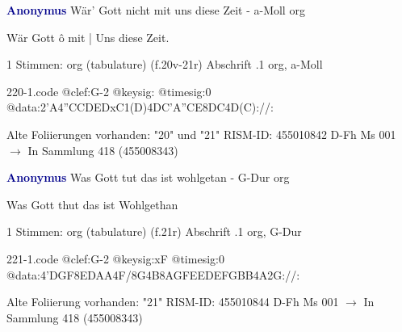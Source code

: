 \documentclass[twocolumn]{book}
\begin{document}
\newline \par \vspace{7pt} \textcolor{darkblue}{\textbf{Anonymus  }}
\newline Wär' Gott nicht mit uns diese Zeit - a-Moll
\newline org
\newline \begin{itshape}[f.20v, at left:] Wär Gott ô mit | Uns diese Zeit.\end{itshape} 
\newline \textcolor{darkblue}{}  1 Stimmen: org (tabulature)  (f.20v-21r)
\newline Abschrift
.1  org, a-Moll  
\begin{filecontents*}{220-1.code}
@clef:G-2
@keysig:
@timesig:0
@data:2'A4''CCDEDxC1(D)4DC'A''CE{8DC}4D(C)://:
\end{filecontents*}
\newline
%
\newline Alte Foliierungen vorhanden: "20" und "21"
\newline RISM-ID: 455010842
\newline D-Fh  Ms 001
\newline $\rightarrow$ In Sammlung 418 (455008343)
      
\newline \par \vspace{7pt} \textcolor{darkblue}{\textbf{Anonymus  }}
\newline Was Gott tut das ist wohlgetan - G-Dur
\newline org
\newline \begin{itshape} Was Gott thut das ist Wohlgethan\end{itshape} 
\newline \textcolor{darkblue}{}  1 Stimmen: org (tabulature)  (f.21r)
\newline Abschrift
.1  org, G-Dur  
\begin{filecontents*}{221-1.code}
@clef:G-2
@keysig:xF
@timesig:0
@data:4'DGF{8ED}{AA}4F/8G4B8A{GFEE}{DEFG}{BB}4A2G://:
\end{filecontents*}
\newline
%
\newline Alte Foliierung vorhanden: "21"
\newline RISM-ID: 455010844
\newline D-Fh  Ms 001
\newline $\rightarrow$ In Sammlung 418 (455008343)
      
\end{document}

